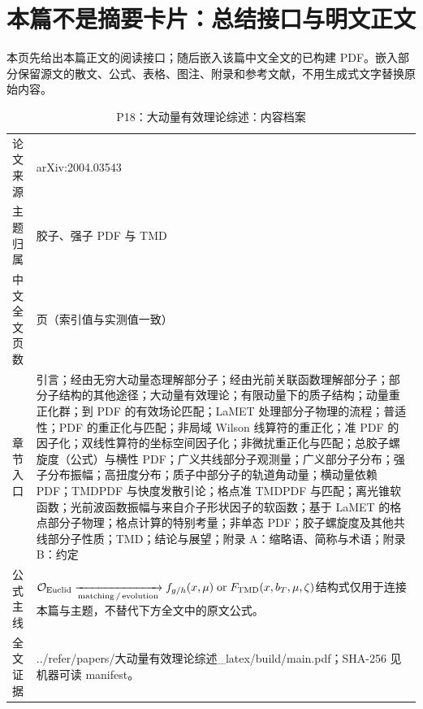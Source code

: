 \documentclass[UTF8,11pt,oneside]{ctexbook}
\begin{document}
\section*{本篇不是摘要卡片：总结接口与明文正文}
本页先给出本篇正文的阅读接口；随后嵌入该篇中文全文的已构建 PDF。嵌入部分保留源文的散文、公式、表格、图注、附录和参考文献，不用生成式文字替换原始内容。
\begin{table}[htbp]
  \centering
  \caption{P18：大动量有效理论综述：内容档案}
  \small
  \begin{tabularx}{0.96\textwidth}{@{}p{3.3cm}>{\raggedright\arraybackslash}X@{}}
    \toprule
    论文来源 & arXiv:2004.03543 \\
    主题归属 & 胶子、强子 PDF 与 TMD \\
    中文全文页数 & 105 页（索引值与实测值一致） \\
    章节入口 & 引言；经由无穷大动量态理解部分子；经由光前关联函数理解部分子；部分子结构的其他途径；大动量有效理论；有限动量下的质子结构；动量重正化群；到 PDF 的有效场论匹配；LaMET 处理部分子物理的流程；普适性；PDF 的重正化与匹配；非局域 Wilson 线算符的重正化；准 PDF 的因子化；双线性算符的坐标空间因子化；非微扰重正化与匹配；总胶子螺旋度（公式）与横性 PDF；广义共线部分子观测量；广义部分子分布；强子分布振幅；高扭度分布；质子中部分子的轨道角动量；横动量依赖 PDF；TMDPDF 与快度发散引论；格点准 TMDPDF 与匹配；离光锥软函数；光前波函数振幅与来自介子形状因子的软函数；基于 LaMET 的格点部分子物理；格点计算的特别考量；非单态 PDF；胶子螺旋度及其他共线部分子性质；TMD；结论与展望；附录 A：缩略语、简称与术语；附录 B：约定 \\
    公式主线 & $\mathcal O_{\rm Euclid}\xrightarrow[\rm matching\,/\,evolution]{}f_{g/h}(x,\mu)\;{\rm or}\;F_{\rm TMD}(x,b_T,\mu,\zeta)$\newline\scriptsize 结构式仅用于连接本篇与主题，不替代下方全文中的原文公式。 \\
    全文证据 & ../\allowbreak{}refer/\allowbreak{}papers/\allowbreak{}大动量有效理论综述\_\allowbreak{}latex/\allowbreak{}build/\allowbreak{}main.pdf；SHA-256 见机器可读 manifest。 \\
    \bottomrule
  \end{tabularx}
\end{table}
\end{document}
